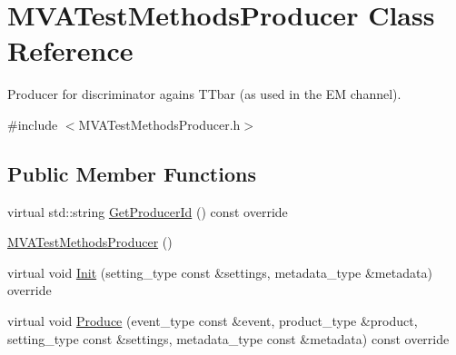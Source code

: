 \hypertarget{classMVATestMethodsProducer}{
\section{MVATestMethodsProducer Class Reference}
\label{classMVATestMethodsProducer}
}


Producer for discriminator agains TTbar (as used in the EM channel).  


{\ttfamily \#include $<$MVATestMethodsProducer.h$>$}\subsection*{Public Member Functions}
\begin{DoxyCompactItemize}
\item 
virtual std::string \hyperlink{classMVATestMethodsProducer_a1795ecbaa668fc1f9492bcd69e76a3d7}{GetProducerId} () const override
\item 
\hyperlink{classMVATestMethodsProducer_a8068f80a6a967eb30f9f00e911f6d55a}{MVATestMethodsProducer} ()
\item 
virtual void \hyperlink{classMVATestMethodsProducer_ab506b8dbdd00dce1bfd273877da3bf5f}{Init} (setting\_\-type const \&settings, metadata\_\-type \&metadata) override
\item 
virtual void \hyperlink{classMVATestMethodsProducer_ad462de17d5f9e2cf8379dc9e8d502f1c}{Produce} (event\_\-type const \&event, product\_\-type \&product, setting\_\-type const \&settings, metadata\_\-type const \&metadata) const override
\end{DoxyCompactItemize}



